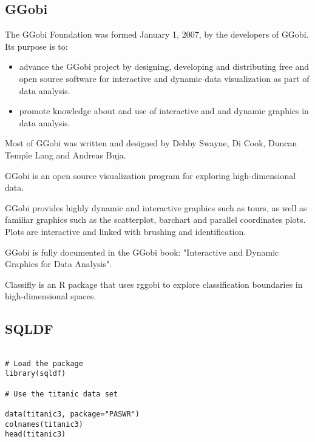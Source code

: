 \subsection{GGobi}

The GGobi Foundation was formed January 1, 2007, by the developers of GGobi. 
Its purpose is to:
\begin{itemize}
\item advance the GGobi project by designing, developing and distributing free and open source software for interactive and dynamic data visualization as part of data analysis.
\item promote knowledge about and use of interactive and and dynamic graphics in data analysis.
\end{itemize}

Most of GGobi was written and designed by Debby Swayne, Di Cook, Duncan Temple Lang and Andreas Buja.

GGobi is an open source visualization program for exploring high-dimensional data. 

GGobi provides highly dynamic and interactive graphics such as tours, as well as familiar graphics such as the scatterplot, barchart and parallel coordinates plots. Plots are interactive and linked with brushing and identification.

GGobi is fully documented in the GGobi book: "Interactive and Dynamic Graphics for Data Analysis".

Classifly is an R package that uses rggobi to explore classification boundaries in high-dimensional spaces.



\subsection{SQLDF}


\begin{framed}
\begin{verbatim}

# Load the package
library(sqldf)

# Use the titanic data set

data(titanic3, package="PASWR")
colnames(titanic3)
head(titanic3)
\end{verbatim}
\end{framed}

